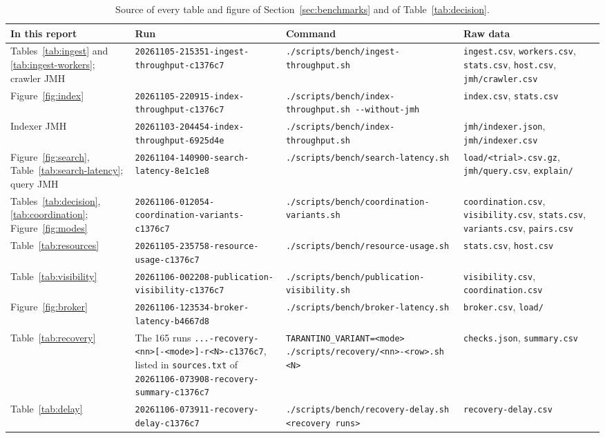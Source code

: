 \documentclass[11pt,a4paper]{article}
\newcommand{\code}[1]{\nolinkurl{#1}}
\newcommand{\run}[1]{\nolinkurl{#1}}
\begin{document}
\begin{table}[!ht]
\centering
\footnotesize
\caption{Source of every table and figure of Section~\ref{sec:benchmarks} and of Table~\ref{tab:decision}.}
\label{tab:runs}
\begin{tabularx}{\textwidth}{@{}L{2.2cm}L{5.4cm}L{3.6cm}Y@{}}
\toprule
In this report & Run & Command & Raw data \\
\midrule
Tables~\ref{tab:ingest} and \ref{tab:ingest-workers}; crawler JMH & \run{20261105-215351-ingest-throughput-c1376c7} & \code{./scripts/bench/ingest-throughput.sh} & \code{ingest.csv}, \code{workers.csv}, \code{stats.csv}, \code{host.csv}, \code{jmh/crawler.csv} \\
Figure~\ref{fig:index} & \run{20261105-220915-index-throughput-c1376c7} & \code{./scripts/bench/index-throughput.sh --without-jmh} & \code{index.csv}, \code{stats.csv} \\
Indexer JMH & \run{20261103-204454-index-throughput-6925d4e} & \code{./scripts/bench/index-throughput.sh} & \code{jmh/indexer.json}, \code{jmh/indexer.csv} \\
Figure~\ref{fig:search}, Table~\ref{tab:search-latency}; query JMH & \run{20261104-140900-search-latency-8e1c1e8} & \code{./scripts/bench/search-latency.sh} & \code{load/<trial>.csv.gz}, \code{jmh/query.csv}, \code{explain/} \\
Tables~\ref{tab:decision}, \ref{tab:coordination}; Figure~\ref{fig:modes} & \run{20261106-012054-coordination-variants-c1376c7} & \code{./scripts/bench/coordination-variants.sh} & \code{coordination.csv}, \code{visibility.csv}, \code{stats.csv}, \code{variants.csv}, \code{pairs.csv} \\
Table~\ref{tab:resources} & \run{20261105-235758-resource-usage-c1376c7} & \code{./scripts/bench/resource-usage.sh} & \code{stats.csv}, \code{host.csv} \\
Table~\ref{tab:visibility} & \run{20261106-002208-publication-visibility-c1376c7} & \code{./scripts/bench/publication-visibility.sh} & \code{visibility.csv}, \code{coordination.csv} \\
Figure~\ref{fig:broker} & \run{20261106-123534-broker-latency-b4667d8} & \code{./scripts/bench/broker-latency.sh} & \code{broker.csv}, \code{load/} \\
Table~\ref{tab:recovery} & The 165 runs \code{...-recovery-<nn>[-<mode>]-r<N>-c1376c7}, listed in \code{sources.txt} of \run{20261106-073908-recovery-summary-c1376c7} & \code{TARANTINO_VARIANT=<mode> ./scripts/recovery/<nn>-<row>.sh <N>} & \code{checks.json}, \code{summary.csv} \\
Table~\ref{tab:delay} & \run{20261106-073911-recovery-delay-c1376c7} & \code{./scripts/bench/recovery-delay.sh <recovery runs>} & \code{recovery-delay.csv} \\
\bottomrule
\end{tabularx}
\end{table}
\end{document}
